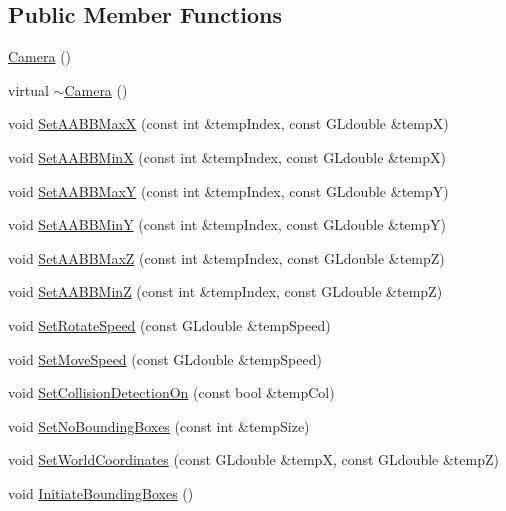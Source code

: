 \subsection*{Public Member Functions}
\begin{DoxyCompactItemize}
\item 
\hyperlink{class_camera_a01f94c3543f56ede7af49dc778f19331}{Camera} ()
\item 
virtual \hyperlink{class_camera_ac9ed2a1433c5afdfb9cdf5b282fbc350}{$\sim$\+Camera} ()
\item 
void \hyperlink{class_camera_a57b68a39284d0c249676a3dba70bac05}{Set\+A\+A\+B\+B\+MaxX} (const int \&temp\+Index, const G\+Ldouble \&tempX)
\item 
void \hyperlink{class_camera_a4c0c8094ebcf2c5255e064ebbb7d562c}{Set\+A\+A\+B\+B\+MinX} (const int \&temp\+Index, const G\+Ldouble \&tempX)
\item 
void \hyperlink{class_camera_a5645577a695fb4b5b59aa948882a27d4}{Set\+A\+A\+B\+B\+MaxY} (const int \&temp\+Index, const G\+Ldouble \&tempY)
\item 
void \hyperlink{class_camera_aa3b852f1208a5e2c9bfa0ee6d1c8e8cc}{Set\+A\+A\+B\+B\+MinY} (const int \&temp\+Index, const G\+Ldouble \&tempY)
\item 
void \hyperlink{class_camera_aaf211279f0439d31fa1d885f1a630db9}{Set\+A\+A\+B\+B\+MaxZ} (const int \&temp\+Index, const G\+Ldouble \&tempZ)
\item 
void \hyperlink{class_camera_ae5dfebfe1c8a018fb2ce96803b6f2c49}{Set\+A\+A\+B\+B\+MinZ} (const int \&temp\+Index, const G\+Ldouble \&tempZ)
\item 
void \hyperlink{class_camera_af1b56a7aee4d2b0c38054e05c0553e51}{Set\+Rotate\+Speed} (const G\+Ldouble \&temp\+Speed)
\item 
void \hyperlink{class_camera_a86a5a6f374125bb58c6a97ba2d921a64}{Set\+Move\+Speed} (const G\+Ldouble \&temp\+Speed)
\item 
void \hyperlink{class_camera_a63b20dd514c4e3fc9990d6a61151387c}{Set\+Collision\+Detection\+On} (const bool \&temp\+Col)
\item 
void \hyperlink{class_camera_a043549232a16c18fe93f35c5d3a40fe2}{Set\+No\+Bounding\+Boxes} (const int \&temp\+Size)
\item 
void \hyperlink{class_camera_a32f72b80b7aaf7a1623dc68239bd446b}{Set\+World\+Coordinates} (const G\+Ldouble \&tempX, const G\+Ldouble \&tempZ)
\item 
void \hyperlink{class_camera_af39ed792820436b916a4d6110413423f}{Initiate\+Bounding\+Boxes} ()

\end{DoxyCompactItemize}
